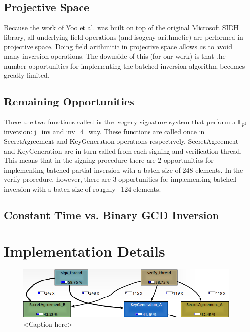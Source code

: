 \subsection{Projective Space}

Because the work of Yoo et al. was built on top of the original Microsoft SIDH library, all underlying field operations (and isogeny arithmetic) are performed in projective space. Doing field arithmitic in projective space allows us to avoid many inversion operations. The downside of this (for our work) is that the number opportunities for implementing the batched inversion algorithm becomes greatly limited.\\

\subsection{Remaining Opportunities}
There are two functions called in the isogeny signature system that perform a $\mathbb{F}_{p^{2}}$ inversion: j\_inv and inv\_4\_way. These functions are called once in SecretAgreement and KeyGeneration operations respectively. SecretAgreement and KeyGeneration are in turn called from each signing and verification thread.\\

This means that in the signing procedure there are 2 opportunities for implementing batched partial-inversion with a batch size of 248 elements. In the verify procedure, however, there are 3 opportunities for implementing batched inversion with a batch size of roughly ~124 elements.\\

\subsection{Constant Time vs. Binary GCD Inversion}

\section{Implementation Details}

\begin{figure}[htb]
\centering
\includegraphics[scale=0.5]{signandverifycall} %
\caption{<Caption here>}
\label{fig:label} %
\end{figure}

